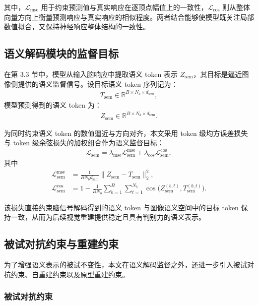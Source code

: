 其中，$\mathcal{L}_{\mathrm{mse}}$ 用于约束预测值与真实响应在逐顶点幅值上的一致性，$\mathcal{L}_{\mathrm{cos}}$ 则从整体向量方向上衡量预测响应与真实响应的相似程度。两者结合能够使模型既关注局部数值拟合，又保持神经响应整体结构的一致性。

\subsection{语义解码模块的监督目标}

在第 3.3 节中，模型从输入脑响应中提取语义 token 表示 $Z_{\mathrm{sem}}$，其目标是逼近图像侧提供的语义监督信号。设目标语义 token 序列记为：
\begin{align}
  T_{\mathrm{sem}} \in \mathbb{R}^{B \times N_b \times d_{\mathrm{sem}}},
\end{align}
模型预测得到的语义 token 为：
\begin{align}
  Z_{\mathrm{sem}} \in \mathbb{R}^{B \times N_b \times d_{\mathrm{sem}}}.
\end{align}

为同时约束语义 token 的数值逼近与方向对齐，本文采用 token 级均方误差损失与 token 级余弦损失的加权组合作为语义监督目标：
\begin{align}
  \mathcal{L}_{\mathrm{sem}} = \lambda_{\mathrm{mse}} \mathcal{L}_{\mathrm{sem}}^{\mathrm{mse}} + \lambda_{\mathrm{cos}} \mathcal{L}_{\mathrm{sem}}^{\mathrm{cos}},
\end{align}
其中
\begin{align}
  \mathcal{L}_{\mathrm{sem}}^{\mathrm{mse}} &= \frac{1}{B N_b d_{\mathrm{sem}}} \lVert Z_{\mathrm{sem}} - T_{\mathrm{sem}} \rVert_2^2, \\
  \mathcal{L}_{\mathrm{sem}}^{\mathrm{cos}} &= 1 - \frac{1}{B N_b} \sum_{b=1}^{B} \sum_{t=1}^{N_b} \cos\bigl(Z_{\mathrm{sem}}^{(b,t)}, T_{\mathrm{sem}}^{(b,t)}\bigr).
\end{align}

该损失直接约束脑信号解码得到的语义 token 与图像语义空间中的目标 token 保持一致，从而为后续视觉重建提供稳定且具有判别力的语义表示。

\subsection{被试对抗约束与重建约束}

为了增强语义表示的被试不变性，本文在语义解码监督之外，还进一步引入被试对抗约束、自重建约束以及原型重建约束。

\subsubsection{被试对抗约束}

